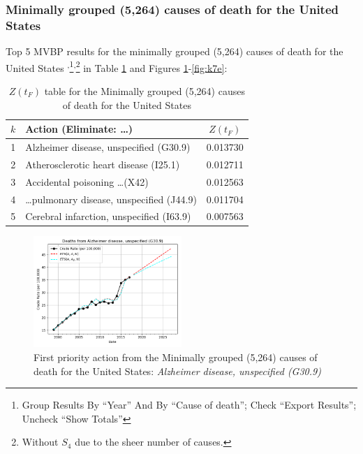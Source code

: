 \documentclass[10pt, a4paper, twocolumn]{IEEEconf}
\begin{document}
\clearpage

\subsubsection{Minimally grouped (5,264) causes of death for the United States}

Top 5 MVBP results for the minimally grouped (5,264) causes of death for the United States \citep{centers2017underlying}\textsuperscript{,}\footnote{Group Results By \enquote{Year} And By \enquote{Cause of death}; Check \enquote{Export Results}; Uncheck \enquote{Show Totals}}\textsuperscript{,}\footnote{Without $S_4$ due to the sheer number of causes.} in Table \ref{table:ztable7} and Figures \ref{fig:k7a}-\ref{fig:k7e}:

\begin{table}[H]
  \centering
  \begin{tabular}{clc}
    \toprule
      $k$ & Action (Eliminate: \ldots) & $Z(t_F)$ \\
    \midrule
      1 &                                Alzheimer disease, unspecified (G30.9) & 0.013730 \\
      2 &                                 Atherosclerotic heart disease (I25.1) & 0.012711 \\
      3 &                                     Accidental poisoning \ldots (X42) & 0.012563 \\
      4 &                         \ldots pulmonary disease, unspecified (J44.9) & 0.011704 \\
      5 &                              Cerebral infarction, unspecified (I63.9) & 0.007563 \\
    \bottomrule
  \end{tabular}
  \caption{$Z(t_F)$ table for the Minimally grouped (5,264) causes of death for the United States}
  \label{table:ztable7}
\end{table}

\begin{figure}[H]
  \centering
  \includegraphics[width=0.5\textwidth]{results/US_ICD10_MINIMALLY_GROUPED/Alzheimer_disease_unspecified_G30_9_ets.png}
  \caption{First priority action from the Minimally grouped (5,264) causes of death for the United States: \textit{Alzheimer disease, unspecified (G30.9)}}\label{fig:k7a}
\end{figure}
\end{document}
